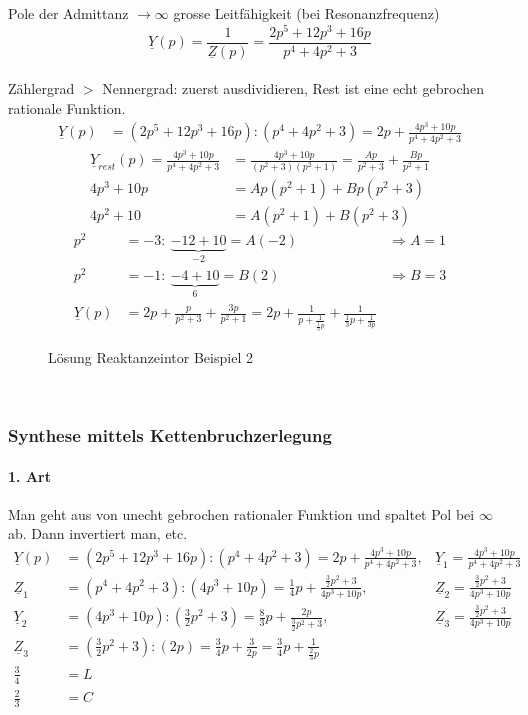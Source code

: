 Pole der Admittanz $\rightarrow \infty$ grosse Leitfähigkeit (bei
Resonanzfrequenz)\\
$$\underline{Y}(p)=\frac{1}{\underline{Z}(p)}=\frac{2p^5+12p^3+16p}{p^4+4p^2+3}$$\\
Zählergrad $>$ Nennergrad: zuerst ausdividieren, Rest ist eine echt gebrochen
rationale Funktion.
\begin{align}
\underline{Y}(p)&=(2p^5+12p^3+16p):(p^4+4p^2+3)=2p+\frac{4p^3+10p}{p^4+4p^2+3}\nonumber
\end{align}
\begin{align}
\underline{Y}_{rest}(p)=\frac{4p^3+10p}{p^4+4p^2+3}&=\frac{4p^3+10p}{(p^2+3)(p^2+1)}=\frac{Ap}{p^2+3}+\frac{Bp}{p^2+1}\nonumber\\
4p^3+10p&=Ap(p^2+1)+Bp(p^2+3)\nonumber\\
4p^2+10&=A(p^2+1)+B(p^2+3)\nonumber
\end{align}
\begin{align}
p^2&=-3:\ \underbrace{-12+10}_{-2}=A(-2) &\Rightarrow A=1\nonumber\\
p^2&=-1:\ \underbrace{-4+10}_{6}=B(2) &\Rightarrow B=3\nonumber\\
\underline{Y}(p)&=2p+\frac{p}{p^2+3}+\frac{3p}{p^2+1}=2p+\frac{1}{p+\frac{1}{\frac{1}{3}p}}+\frac{1}{\frac{1}{3}p+\frac{1}{3p}}\nonumber
\end{align}
\begin{figure}[!ht]
	\centering
	
	\caption{Lösung Reaktanzeintor Beispiel 2}
	\label{fig:RetSyntheseBsp2L}
\end{figure}\\


\subsubsection{Synthese mittels Kettenbruchzerlegung}
\paragraph{1. Art}
Man geht aus von unecht gebrochen rationaler Funktion und
spaltet Pol bei $\infty$ ab. Dann invertiert man, etc.
\begin{align}
	\underline{Y}(p)&=\left(2p^5+12p^3+16p\right):\left(p^4+4p^2+3\right)=2p+\frac{4p^3+10p}{p^4+4p^2+3},
	&\underline{Y}_1=\frac{4p^3+10p}{p^4+4p^2+3}\nonumber\\
	\underline{Z}_1&=\left(p^4+4p^2+3\right):\left(4p^3+10p\right)=\frac{1}{4}p+\frac{\frac{3}{2}p^2+3}{4p^3+10p},
	&\underline{Z}_2=\frac{\frac{3}{2}p^2+3}{4p^3+10p}\nonumber\\
	\underline{Y}_2&=\left(4p^3+10p\right):\left(\frac{3}{2}p^2+3\right)=\frac{8}{3}p+\frac{2p}{\frac{3}{2}p^2+3},
	&\underline{Z}_3=\frac{\frac{3}{2}p^2+3}{4p^3+10p}\nonumber\\
	\underline{Z}_3&=\left(\frac{3}{2}p^2+3\right):\left(2p\right)=\frac{3}{4}p+\frac{3}{2p}=\frac{3}{4}p+\frac{1}{\frac{2}{3}p}\nonumber\\
	\frac{3}{4}&=L\nonumber\\ \frac{2}{3}&=C\nonumber
\end{align}
